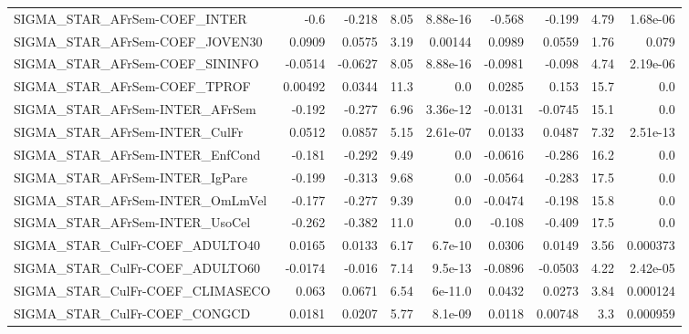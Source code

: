 \begin{tabular}{lrrrrrrrr}
SIGMA\_STAR\_AFrSem-COEF\_INTER          &        -0.6 &       -0.218 &     8.05 & 8.88e-16 &     -0.568 &      -0.199 &         4.79 &      1.68e-06 \\
SIGMA\_STAR\_AFrSem-COEF\_JOVEN30        &      0.0909 &       0.0575 &     3.19 &  0.00144 &     0.0989 &      0.0559 &         1.76 &         0.079 \\
SIGMA\_STAR\_AFrSem-COEF\_SININFO        &     -0.0514 &      -0.0627 &     8.05 & 8.88e-16 &    -0.0981 &      -0.098 &         4.74 &      2.19e-06 \\
SIGMA\_STAR\_AFrSem-COEF\_TPROF          &     0.00492 &       0.0344 &     11.3 &      0.0 &     0.0285 &       0.153 &         15.7 &           0.0 \\
SIGMA\_STAR\_AFrSem-INTER\_AFrSem        &      -0.192 &       -0.277 &     6.96 & 3.36e-12 &    -0.0131 &     -0.0745 &         15.1 &           0.0 \\
SIGMA\_STAR\_AFrSem-INTER\_CulFr         &      0.0512 &       0.0857 &     5.15 & 2.61e-07 &     0.0133 &      0.0487 &         7.32 &      2.51e-13 \\
SIGMA\_STAR\_AFrSem-INTER\_EnfCond       &      -0.181 &       -0.292 &     9.49 &      0.0 &    -0.0616 &      -0.286 &         16.2 &           0.0 \\
SIGMA\_STAR\_AFrSem-INTER\_IgPare        &      -0.199 &       -0.313 &     9.68 &      0.0 &    -0.0564 &      -0.283 &         17.5 &           0.0 \\
SIGMA\_STAR\_AFrSem-INTER\_OmLmVel       &      -0.177 &       -0.277 &     9.39 &      0.0 &    -0.0474 &      -0.198 &         15.8 &           0.0 \\
SIGMA\_STAR\_AFrSem-INTER\_UsoCel        &      -0.262 &       -0.382 &     11.0 &      0.0 &     -0.108 &      -0.409 &         17.5 &           0.0 \\
SIGMA\_STAR\_CulFr-COEF\_ADULTO40        &      0.0165 &       0.0133 &     6.17 &  6.7e-10 &     0.0306 &      0.0149 &         3.56 &      0.000373 \\
SIGMA\_STAR\_CulFr-COEF\_ADULTO60        &     -0.0174 &       -0.016 &     7.14 &  9.5e-13 &    -0.0896 &     -0.0503 &         4.22 &      2.42e-05 \\
SIGMA\_STAR\_CulFr-COEF\_CLIMASECO       &       0.063 &       0.0671 &     6.54 &  6e-11.0 &     0.0432 &      0.0273 &         3.84 &      0.000124 \\
SIGMA\_STAR\_CulFr-COEF\_CONGCD          &      0.0181 &       0.0207 &     5.77 &  8.1e-09 &     0.0118 &     0.00748 &          3.3 &      0.000959 \\

\end{tabular}
